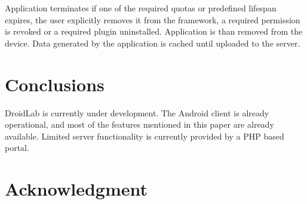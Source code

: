 \documentclass[conference,letterpaper]{IEEEtran}
\begin{document}
Application terminates if one of the required quotas or predefined lifespan expires, the user explicitly removes it from the framework, a required permission is revoked or a required plugin uninstalled. Application is than removed from the device. Data generated by the application is cached until uploaded to the server.

\section{Conclusions}
\label{sec:conclusion_and_future_work}
DroidLab is currently under development. The Android client is already operational, and most of the features mentioned in this paper are already available. Limited server functionality is currently provided by a PHP based portal.


\section{Acknowledgment}
\label{sec:acknowledgment}


\end{document}
